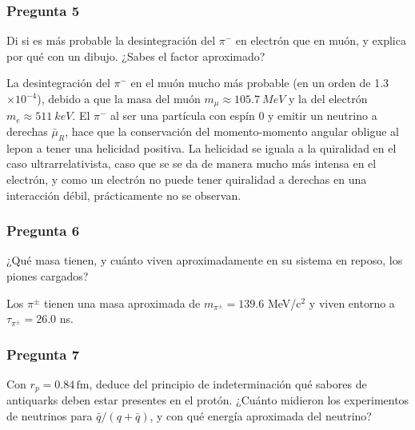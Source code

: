 \begin{Enunciado}
	\subsubsection*{Pregunta 5}

	Di si es más probable la desintegración del $\pi^-$ en electrón que en muón, y explica por qué con un dibujo. ¿Sabes el factor aproximado?

\end{Enunciado}

La desintegración del $\pi^-$ en el muón mucho más probable (en un orden de 1.3$\times 10^{-4}$), debido a que la masa del muón $m_\mu\approx \SI{105.7}{MeV}$ y la del electrón $m_e\approx \SI{511}{keV}$. El $\pi^-$ al ser una partícula con espín 0 y emitir un neutrino a derechas $\bar{\mu}_R$, hace que la conservación del momento-momento angular  obligue al lepon a tener una helicidad positiva. La helicidad se iguala a la quiralidad en el caso ultrarrelativista, caso que se se da de manera mucho más intensa en el electrón, y como un electrón no puede tener quiralidad a derechas en una interacción débil, prácticamente no se observan.


\vspace*{2em}

\begin{Enunciado}
	\subsubsection*{Pregunta 6}

	¿Qué masa tienen, y cuánto viven aproximadamente en su sistema en reposo, los piones cargados?

\end{Enunciado}

Los $\pi^{\pm}$ tienen una masa aproximada de $m_{\pi^{\pm}}=139.6$ MeV/c$^2$ y viven entorno a $\tau_{\pi^{\pm}}=$26.0 ns.

\vspace*{2em}

\begin{Enunciado}
	\subsubsection*{Pregunta 7}

	Con $r_p = 0.84\,\mathrm{fm}$, deduce del principio de indeterminación qué sabores de antiquarks deben estar presentes en el protón. ¿Cuánto midieron los experimentos de neutrinos para $\bar{q}/(q + \bar{q})$, y con qué energía aproximada del neutrino?

\end{Enunciado}

